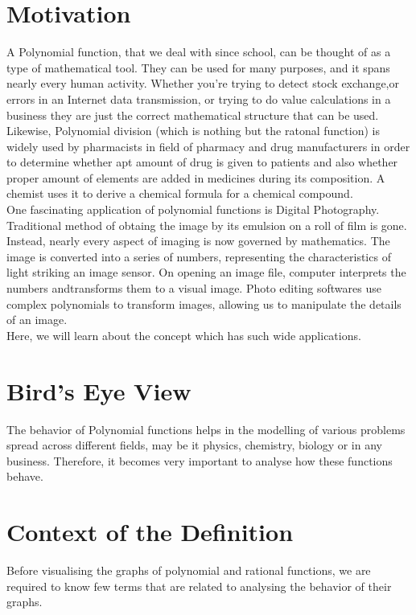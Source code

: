 \documentclass[12pt,a4paper]{article}
\begin{document}
\section{Motivation}
A Polynomial function, that we deal with since school, can be thought of as a type of mathematical tool. 
They can be used for many purposes, and it spans nearly every human activity. Whether you’re trying to detect stock exchange,or errors in an Internet data transmission, or trying to do  value calculations in a business they are just the correct mathematical structure that can be used. \\
Likewise, Polynomial division (which is nothing but the ratonal function) is widely used by pharmacists in field of pharmacy and drug manufacturers in order to determine whether apt amount of drug is given to patients and also whether proper amount of elements are added in medicines during its composition. A chemist uses it to derive a chemical formula for a chemical compound. \\
One fascinating application of polynomial functions is Digital Photography. Traditional method of obtaing the image by its emulsion on a roll of film is gone. Instead, nearly every aspect of imaging is now governed by mathematics. The image is converted into a series of numbers, representing the characteristics of light striking an image sensor. On opening an image file, computer interprets the numbers andtransforms them to a visual image. Photo editing softwares use complex polynomials to transform images, allowing us to manipulate the  details of an image. \\
Here, we will learn about the concept which has such wide applications.
\section{Bird’s Eye View}
The behavior of Polynomial functions helps in the modelling of various problems spread across different fields, may be it physics, chemistry, biology or in any business. Therefore, it becomes very important to analyse how these functions behave. 
\section{Context of the Definition}
Before visualising the graphs of polynomial and rational functions, we are required to know few terms that are related to analysing the behavior of their graphs.\\
\end{document}
